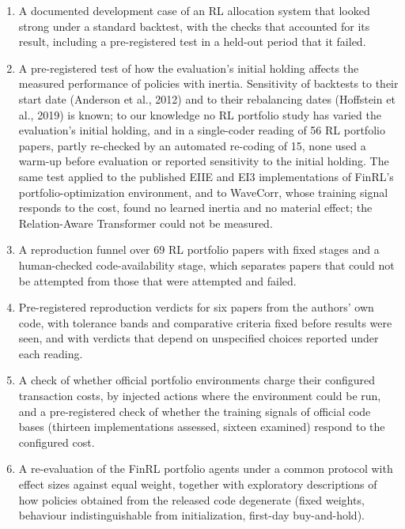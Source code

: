 \documentclass[12pt,a4paper]{report}
\providecommand{\tightlist}{\setlength{\itemsep}{0pt}\setlength{\parskip}{0pt}}
\newcounter{none} %
\begin{document}
\begin{enumerate}
\def\labelenumi{\arabic{enumi}.}
\tightlist
\item
  A documented development case of an RL allocation system that looked
  strong under a standard backtest, with the checks that accounted for
  its result, including a pre-registered test in a held-out period that
  it failed.
\item
  A pre-registered test of how the evaluation's initial holding affects
  the measured performance of policies with inertia. Sensitivity of
  backtests to their start date (Anderson et al., 2012) and to their
  rebalancing dates (Hoffstein et al., 2019) is known; to our knowledge
  no RL portfolio study has varied the evaluation's initial holding, and
  in a single-coder reading of 56 RL portfolio papers, partly re-checked
  by an automated re-coding of 15, none used a warm-up before evaluation
  or reported sensitivity to the initial holding. The same test applied
  to the published EIIE and EI3 implementations of FinRL's
  portfolio-optimization environment, and to WaveCorr, whose training
  signal responds to the cost, found no learned inertia and no material
  effect; the Relation-Aware Transformer could not be measured.
\item
  A reproduction funnel over 69 RL portfolio papers with fixed stages
  and a human-checked code-availability stage, which separates papers
  that could not be attempted from those that were attempted and failed.
\item
  Pre-registered reproduction verdicts for six papers from the authors'
  own code, with tolerance bands and comparative criteria fixed before
  results were seen, and with verdicts that depend on unspecified
  choices reported under each reading.
\item
  A check of whether official portfolio environments charge their
  configured transaction costs, by injected actions where the
  environment could be run, and a pre-registered check of whether the
  training signals of official code bases (thirteen implementations
  assessed, sixteen examined) respond to the configured cost.
\item
  A re-evaluation of the FinRL portfolio agents under a common protocol
  with effect sizes against equal weight, together with exploratory
  descriptions of how policies obtained from the released code
  degenerate (fixed weights, behaviour indistinguishable from
  initialization, first-day buy-and-hold).
\end{enumerate}
\end{document}
